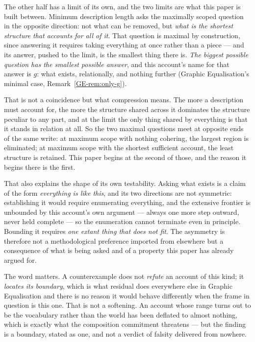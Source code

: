 \documentclass[11pt,a4paper]{article}
\begin{document}
The other half has a limit of its own, and the two limits are what this paper is built between. Minimum
description length asks the maximally scoped question in the opposite direction: not what can be
removed, but \emph{what is the shortest structure that accounts for all of it}. That question is
maximal by construction, since answering it requires taking everything at once rather than a piece ---
and its answer, pushed to the limit, is the smallest thing there is. \emph{The biggest possible question
has the smallest possible answer}, and this account's name for that answer is $g$: what exists,
relationally, and nothing further (Graphic Equalisation's minimal case, Remark~\ref{GE-rem:only-g}).

That is not a coincidence but what compression means. The more a description must account for, the more
the structure shared across it dominates the structure peculiar to any part, and at the limit the only
thing shared by everything is that it stands in relation at all. So the two maximal questions meet at
opposite ends of the same write: at maximum scope with nothing cohering, the largest region is
eliminated; at maximum scope with the shortest sufficient account, the least structure is retained.
This paper begins at the second of those, and the reason it begins there is the first.

That also explains the shape of its own testability. Asking what exists is a claim of the form \emph{everything is like this}, and its two
directions are not symmetric: establishing it would require enumerating everything, and the extensive
frontier is unbounded by this account's own argument --- always one more step outward, never held
complete --- so the enumeration cannot terminate even in principle. Bounding it requires \emph{one extant thing that does not fit}. The
asymmetry is therefore not a methodological preference imported from elsewhere but a consequence of
what is being asked and of a property this paper has already argued for.

The word matters. A counterexample does not
\emph{refute} an account of this kind; it \emph{locates its boundary}, which is what residual does
everywhere else in Graphic Equalisation and there is no reason it would behave differently when the frame in
question is this one. That is not a softening. An account whose range turns out to be the vocabulary
rather than the world has been deflated to almost nothing, which is exactly what the composition
commitment threatens --- but the finding is a boundary, stated as one, and not a verdict of falsity
delivered from nowhere.
\end{document}
